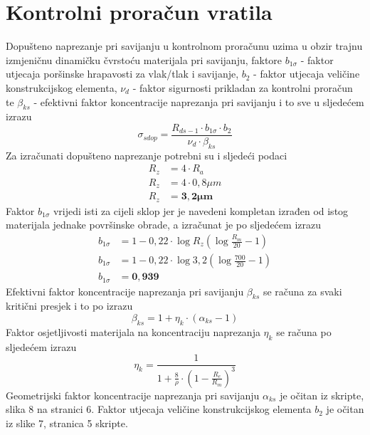 \documentclass[11pt,a4paper]{article}
\begin{document}
\section{Kontrolni proračun vratila}
Dopušteno naprezanje pri savijanju u kontrolnom proračunu uzima u obzir trajnu izmjeničnu dinamičku čvrstoću materijala pri savijanju, faktore $b_{1 \sigma}$ - faktor utjecaja poršinske hrapavosti za vlak/tlak i savijanje, $b_2$ - faktor utjecaja veličine konstrukcijskog elementa, $\nu_d$ - faktor sigurnosti prikladan za kontrolni proračun te $\beta_{ks}$ - efektivni faktor koncentracije naprezanja pri savijanju i to sve u sljedećem izrazu
\begin{equation}
\sigma_{sdop}=\frac{R_{ds-1} \cdot b_{1 \sigma} \cdot b_2}{\nu_d \cdot \beta_{ks}}\label{equ:dozvoljenoNaprezanje_kontrolni_savijanje}
\end{equation}
Za izračunati dopušteno naprezanje potrebni su i sljedeći podaci
\begin{align*}
R_z&=4 \cdot R_a\\
R_z&=4 \cdot 0,8 \mu m\\
R_z&=\mathbf{3,2 \mu m}
\end{align*}
Faktor $b_{1 \sigma}$ vrijedi isti za cijeli sklop jer je navedeni kompletan izrađen od istog materijala jednake površinske obrade, a izračunat je po sljedećem izrazu
\begin{align*}
b_{1 \sigma}&=1-0,22 \cdot \log R_z \left( \log \frac{R_m}{20}-1 \right)\\
b_{1 \sigma}&=1-0,22 \cdot \log 3,2 \left( \log \frac{700}{20}-1 \right)\\
b_{1 \sigma}&=\mathbf{0,939}
\end{align*}
Efektivni faktor koncentracije naprezanja pri savijanju $\beta_{ks}$ se računa za svaki kritični presjek i to po izrazu
\begin{equation}
\beta_{ks}=1+ \eta_k \cdot (\alpha_{ks}-1)\label{equ:beta_KS}
\end{equation}
Faktor osjetljivosti materijala na koncentraciju naprezanja $\eta_k$ se računa po sljedećem izrazu
\begin{equation}
\eta_k=\frac{1}{1+\frac{8}{\rho} \cdot \left( 1- \frac{R_e}{R_m} \right)^3}\label{equ:eta_K}
\end{equation}
Geometrijski faktor koncentracije naprezanja pri savijanju $\alpha_{ks}$ je očitan iz skripte, slika 8 na stranici 6. Faktor utjecaja veličine konstrukcijskog elementa $b_2$ je očitan iz slike 7, stranica 5 skripte.
\end{document}
